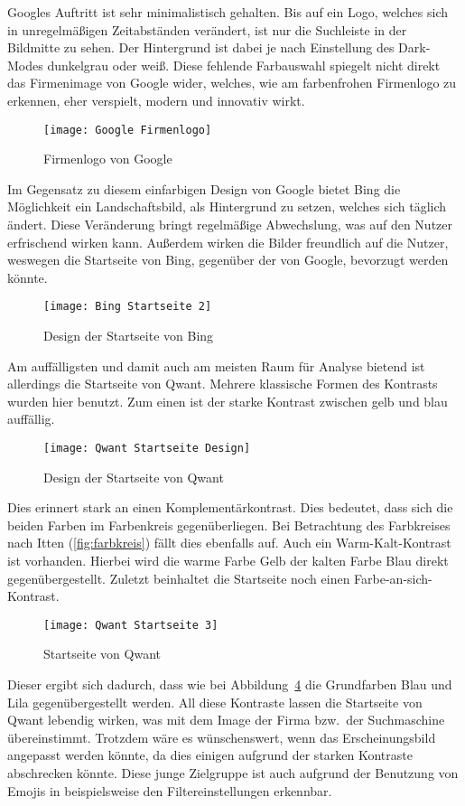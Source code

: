 Googles Auftritt ist sehr minimalistisch gehalten.
Bis auf ein Logo, welches sich in unregelmäßigen Zeitabständen verändert,
ist nur die Suchleiste in der Bildmitte zu sehen.
Der Hintergrund ist dabei je nach Einstellung des Dark-Modes dunkelgrau oder weiß.
Diese fehlende Farbauswahl spiegelt nicht direkt das Firmenimage von Google wider, welches, wie am farbenfrohen
Firmenlogo zu erkennen, eher verspielt, modern und innovativ wirkt.
\begin{figure}[ht]
    \centering
    \texttt{[image: Google Firmenlogo]}
    \caption{Firmenlogo von Google\autocite{GoogleLogo}}\label{fig:figure4}
\end{figure}

Im Gegensatz zu diesem einfarbigen Design von Google bietet Bing die Möglichkeit ein Landschaftsbild, als Hintergrund zu
setzen, welches sich täglich ändert.
Diese Veränderung bringt regelmäßige Abwechslung, was auf den Nutzer erfrischend wirken kann.
Außerdem wirken die Bilder freundlich auf die Nutzer, weswegen die Startseite von Bing, gegenüber der von Google,
bevorzugt werden könnte.
\begin{figure}[ht]
    \centering
    \texttt{[image: Bing Startseite 2]}
    \caption{Design der Startseite von Bing}\label{fig:figure5}
\end{figure}

Am auffälligsten und damit auch am meisten Raum für Analyse bietend ist allerdings die Startseite von Qwant.
Mehrere klassische Formen des Kontrasts wurden hier benutzt.
Zum einen ist der starke Kontrast zwischen gelb und blau auffällig.
\begin{figure}[ht]
    \centering
    \texttt{[image: Qwant Startseite Design]}
    \caption{Design der Startseite von Qwant}\label{fig:figure6}
\end{figure}
Dies erinnert stark an einen Komplementärkontrast.
Dies bedeutet, dass sich die beiden Farben im Farbenkreis gegenüberliegen.\autocite[Seite 33]{Maulhardt3}
Bei Betrachtung des Farbkreises nach Itten (\ref{fig:farbkreis}) fällt dies ebenfalls auf.
Auch ein Warm-Kalt-Kontrast ist vorhanden.
Hierbei wird die warme Farbe Gelb der kalten Farbe Blau direkt gegenübergestellt.\autocite[Seite 34]{Maulhardt3}
Zuletzt beinhaltet die Startseite noch einen Farbe-an-sich-Kontrast.
\begin{figure}[ht]
    \centering
    \texttt{[image: Qwant Startseite 3]}
    \caption{Startseite von Qwant}
    \label{fig:qwantstartseite3}
\end{figure}
Dieser ergibt sich dadurch,
dass wie bei Abbildung~\ref{fig:qwantstartseite3} die Grundfarben Blau und Lila gegenübergestellt werden.\autocite[Seite 38]{Maulhardt3}
All diese Kontraste lassen die Startseite von Qwant lebendig wirken, was mit dem Image der Firma bzw.\ der Suchmaschine übereinstimmt.
Trotzdem wäre es wünschenswert, wenn das Erscheinungsbild angepasst werden könnte, da dies einigen aufgrund der starken
Kontraste abschrecken könnte.
Diese junge Zielgruppe ist auch aufgrund der Benutzung von Emojis in beispielsweise den
Filtereinstellungen erkennbar.

